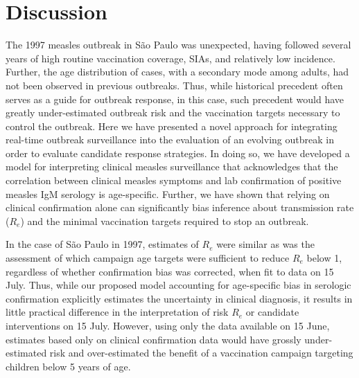 \section{Discussion}\label{discussion}

The 1997 measles outbreak in S\~{a}o Paulo was unexpected, having followed several years of high routine vaccination coverage, SIAs, and relatively low incidence. Further, the age distribution of cases, with a secondary mode among adults, had not been observed in previous outbreaks. Thus, while historical precedent often serves as a guide for outbreak response, in this case, such precedent would have greatly under-estimated outbreak risk and the vaccination targets necessary to control the outbreak. Here we have presented a novel approach for integrating real-time outbreak surveillance into the evaluation of an evolving outbreak in order to evaluate candidate response strategies. In doing so, we have developed a model for interpreting clinical measles surveillance that acknowledges that the correlation between clinical measles symptoms and lab confirmation of positive measles IgM serology is age-specific. Further, we have shown that relying on clinical confirmation alone can significantly bias inference about transmission rate ($R_e$) and the minimal vaccination targets required to stop an outbreak.

In the case of S\~{a}o Paulo in 1997, estimates of $R_e$ were similar as was the assessment of which campaign age targets were sufficient to reduce $R_e$ below 1, regardless of whether confirmation bias was corrected, when fit to data on 15 July. Thus, while our proposed model accounting for age-specific bias in serologic confirmation explicitly estimates the uncertainty in clinical diagnosis, it results in little practical difference in the interpretation of risk $R_e$ or candidate interventions on 15 July. However, using only the data available on 15 June, estimates based only on clinical confirmation data would have grossly under-estimated risk and over-estimated the benefit of a vaccination campaign targeting children below 5 years of age. 

